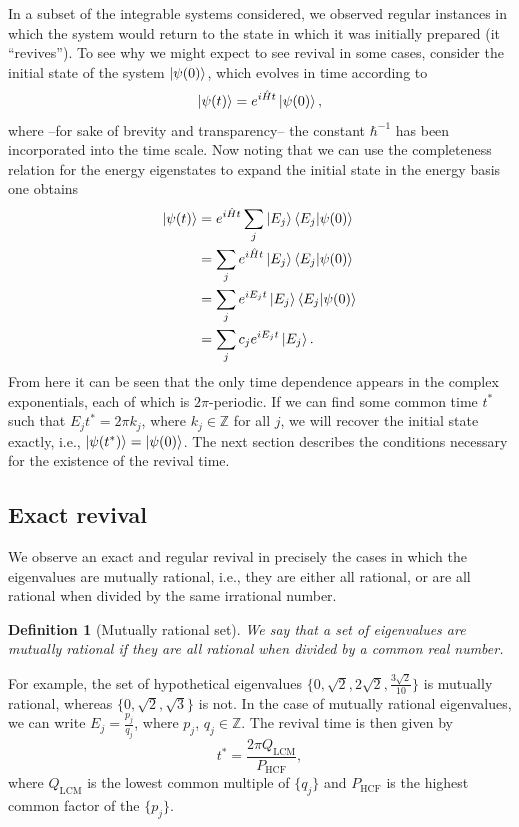 \documentclass[a4paper, 10pt]{article}
\theoremstyle{plain}
\newtheorem{definition}[]{Definition}
\begin{document}
In a subset of the integrable systems considered, we observed regular instances
in which the system would return to the state in which it was initially
prepared (it ``revives''). To see why we might expect to see revival in
some cases, consider the initial state of the system $\ket{\psi(0)}$, which
evolves in time according to
\begin{equation}
    \ket{\psi(t)} = e^{i \hat{H} t} \ket{\psi(0)},
\end{equation}
where --for sake of brevity and transparency-- the constant $\hbar^{-1}$ has
been incorporated into the time scale. Now noting that we can use the
completeness relation for the energy eigenstates to expand the initial state in
the energy basis one obtains
\begin{align}
\label{time_evolution}
 \ket{\psi(t)} &= e^{i\hat{H}t}\sum_j\ket{E_j}\braket{E_j|\psi(0)}  \nonumber \\
               &= \sum_je^{i\hat{H}t}\ket{E_j}\braket{E_j|\psi(0)}  \nonumber \\
               &= \sum_je^{iE_{j}t}\ket{E_j}\braket{E_j|\psi(0)}    \nonumber \\
               &= \sum_j c_{j}e^{iE_{j}t}\ket{E_j}.
\end{align}
From here it can be seen that the only time dependence appears in the complex
exponentials, each of which is $2 \pi$-periodic. If we can find some common time
$t^{\ast}$ such that $E_{j} t^{\ast} = 2 \pi k_{j}$, where $k_{j} \in\mathbb{Z}$
for all $j$, we will recover the initial state exactly, i.e.,
$\ket{\psi(t^{\ast})} = \ket{\psi(0)}$. The next section describes the
conditions necessary for the existence of the revival time.


\subsection{Exact revival}

We observe an exact and regular revival in precisely the cases in which the
eigenvalues are mutually rational, i.e., they are either all rational, or are
all rational when divided by the same irrational number.
\begin{definition}[Mutually rational set]
    We say that a set of eigenvalues are mutually rational if they are all
    rational when divided by a common real number.
\end{definition}
For example, the set of hypothetical eigenvalues $\lbrace 0, \sqrt{2}, 2
\sqrt{2}, \frac{3 \sqrt{2}}{10} \rbrace$ is mutually rational, whereas $\lbrace
0, \sqrt{2}, \sqrt{3}\rbrace$ is not. In the case of mutually rational
eigenvalues, we can write $E_{j} = \frac{p_{j}}{q_{j}}$, where $p_{j}$, $q_{j}
\in \mathbb{Z}$. The revival time is then given by
\begin{equation}
    \label{revival_time_formula}
    t^{\ast} = \frac{2 \pi Q_{\text{LCM}}}{P_{\text{HCF}}},
\end{equation}
where $Q_{\text{LCM}}$ is the lowest common multiple of $\lbrace q_{j} \rbrace$
and $P_{\text{HCF}}$ is the highest common factor of the $\lbrace p_{j} \rbrace$.
\end{document}
